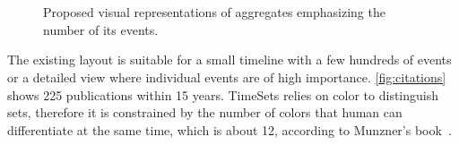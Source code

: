 \begin{figure}[!htb]
	\centering
	\\
	\hfill
	\\
	\hfill
	\caption{Proposed visual representations of aggregates emphasizing the number of its events.}
	\label{fig:ts-aggreate}
\end{figure}

The existing layout is suitable for a small timeline with a few hundreds of events or a detailed view where individual events are of high importance. \autoref{fig:citations} shows 225 publications within 15 years. TimeSets relies on color to distinguish sets, therefore it is constrained by the number of colors that human can differentiate at the same time, which is about 12, according to Munzner's book~\cite{Munzner2014}.